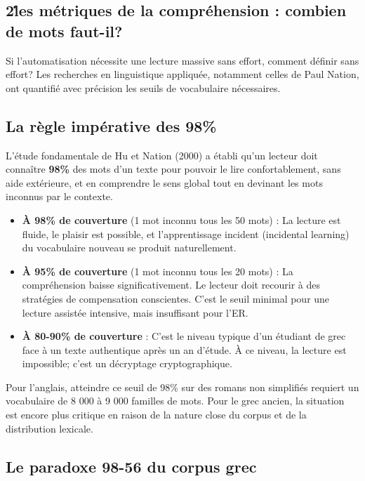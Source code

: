 \subsection{2\. les métriques de la compréhension : combien de mots faut-il?}

Si l'automatisation nécessite une lecture massive sans effort, comment définir \og sans effort\fg{}?
Les recherches en linguistique appliquée, notamment celles de Paul Nation, ont quantifié avec
précision les seuils de vocabulaire nécessaires.



\subsection{La règle impérative des 98\%}

L'étude fondamentale de Hu et Nation (2000) a établi qu'un lecteur doit connaître \textbf{98\%} des
mots d'un texte pour pouvoir le lire confortablement, sans aide extérieure, et en comprendre le sens
global tout en devinant les mots inconnus par le contexte.\cite{III-3-2-ref18}

\begin{itemize}\item \textbf{À 98\% de couverture} (1 mot inconnu tous les 50 mots) : La lecture est fluide, le plaisir est possible, et l'apprentissage incident (incidental learning) du vocabulaire nouveau se produit naturellement.\item \textbf{À 95\% de couverture} (1 mot inconnu tous les 20 mots) : La compréhension baisse significativement. Le lecteur doit recourir à des stratégies de compensation conscientes. C'est le seuil minimal pour une lecture assistée intensive, mais insuffisant pour l'ER.\cite{III-3-2-ref19}\item \textbf{À 80-90\% de couverture} : C'est le niveau typique d'un étudiant de grec face à un texte authentique après un an d'étude. À ce niveau, la lecture est impossible; c'est un décryptage cryptographique.\cite{III-3-2-ref20}\end{itemize}Pour l'anglais, atteindre ce seuil de 98\% sur des romans non simplifiés requiert un vocabulaire de
8 000 à 9 000 familles de mots.\cite{III-3-2-ref20} Pour le grec ancien, la situation est encore
plus critique en raison de la nature close du corpus et de la distribution lexicale.



\subsection{Le paradoxe 98-56 du corpus grec}


